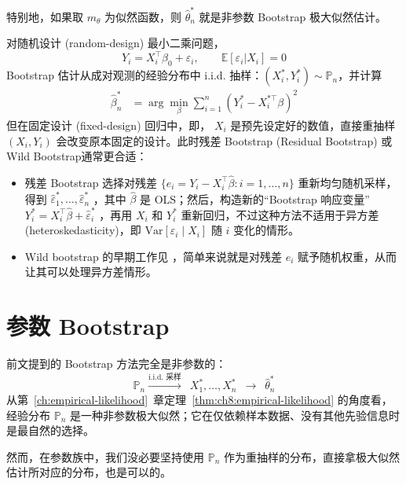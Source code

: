 特别地，如果取 $m_\theta$ 为似然函数，则 $\widehat\theta_n^*$ 就是非参数 Bootstrap 极大似然估计。

\begin{example}[随机设计最小二乘]\label{ex:ch11:wild-bootstrap}

对随机设计 (random-design) 最小二乘问题，
\[Y_i=X_i^{\top }\beta_0+\varepsilon_i, \qquad \mathbb{E}[\varepsilon_i|X_i]=0\]
Bootstrap 估计从成对观测的经验分布中 i.i.d. 抽样：$(X_i^*,Y_i^*)\sim \mathbb{P}_n$，并计算
\[\begin{aligned} \widehat{\beta}_n^* &= \arg\min_\beta \sum_{i=1}^n (Y_i^*-X_i^{*\top} \beta)^2 \end{aligned}\]
但在固定设计 (fixed-design) 回归中，即， $X_i$ 是预先设定好的数值，直接重抽样 $(X_i,Y_i)$ 会改变原本固定的设计。此时残差 Bootstrap (Residual Bootstrap) 或 Wild Bootstrap通常更合适：

\begin{itemize}
\tightlist
\item
  残差 Bootstrap 选择对残差 $\{e_i=Y_i- X_i^\top\widehat\beta:i=1,\dots,n\}$ 重新均匀随机采样，得到 $\widehat\varepsilon^*_1,\dots,\widehat\varepsilon^*_n$ ，其中 $\widehat\beta$ 是 OLS；然后，构造新的``Bootstrap 响应变量'' $Y^*_i=X_i^{\top }\widehat\beta+\widehat\varepsilon_i^*$ ，再用 $X_i$ 和 $Y_i^*$ 重新回归，不过这种方法不适用于异方差 (heteroskedasticity)，即 $\mathrm{Var}[\varepsilon_i\mid X_i]$ 随 $i$ 变化的情形。
\item
  Wild bootstrap 的早期工作见 \cite{wu1986,liu1988}，简单来说就是对残差 $e_i$ 赋予随机权重，从而让其可以处理异方差情形。
\end{itemize}


\end{example}

\section{参数 Bootstrap}

前文提到的 Bootstrap 方法完全是非参数的：
\[\mathbb P_n\overset{\text{i.i.d. 采样}}\longrightarrow \enspace X_1^*,\dots,X_n^*\enspace\longrightarrow \enspace \widehat\theta_n^*\]
从第~\ref{ch:empirical-likelihood}~章定理~\ref{thm:ch8:empirical-likelihood} 的角度看，经验分布 $\mathbb P_n$ 是一种非参数极大似然；它在仅依赖样本数据、没有其他先验信息时是最自然的选择。

然而，在参数族中，我们没必要坚持使用 $\mathbb P_n$ 作为重抽样的分布，直接拿极大似然估计所对应的分布，也是可以的。

